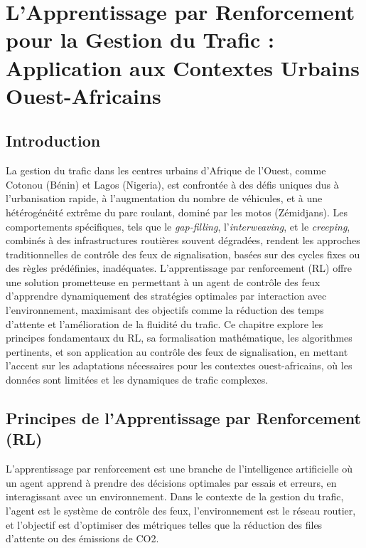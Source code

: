 \chapter{L'Apprentissage par Renforcement pour la Gestion du Trafic : Application aux Contextes Urbains Ouest-Africains}
\label{chap:rl_gestion_trafic}

\section{Introduction}
\label{sec:rl_intro}

La gestion du trafic dans les centres urbains d'Afrique de l'Ouest, comme Cotonou (Bénin) et Lagos (Nigeria), est confrontée à des défis uniques dus à l'urbanisation rapide, à l'augmentation du nombre de véhicules, et à une hétérogénéité extrême du parc roulant, dominé par les motos (Zémidjans). Les comportements spécifiques, tels que le \textit{gap-filling}, l'\textit{interweaving}, et le \textit{creeping}, combinés à des infrastructures routières souvent dégradées, rendent les approches traditionnelles de contrôle des feux de signalisation, basées sur des cycles fixes ou des règles prédéfinies, inadéquates. L'apprentissage par renforcement (RL) offre une solution prometteuse en permettant à un agent de contrôle des feux d'apprendre dynamiquement des stratégies optimales par interaction avec l'environnement, maximisant des objectifs comme la réduction des temps d'attente et l'amélioration de la fluidité du trafic. Ce chapitre explore les principes fondamentaux du RL, sa formalisation mathématique, les algorithmes pertinents, et son application au contrôle des feux de signalisation, en mettant l'accent sur les adaptations nécessaires pour les contextes ouest-africains, où les données sont limitées et les dynamiques de trafic complexes.

\section{Principes de l'Apprentissage par Renforcement (RL)}
\label{sec:rl_principes}

L'apprentissage par renforcement est une branche de l'intelligence artificielle où un agent apprend à prendre des décisions optimales par essais et erreurs, en interagissant avec un environnement. Dans le contexte de la gestion du trafic, l'agent est le système de contrôle des feux, l'environnement est le réseau routier, et l'objectif est d'optimiser des métriques telles que la réduction des files d'attente ou des émissions de CO2.

